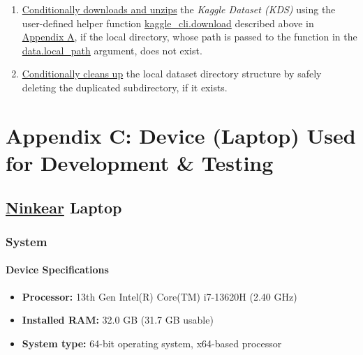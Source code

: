 \documentclass[
]{report}
\providecommand{\tightlist}{%
  \setlength{\itemsep}{0pt}\setlength{\parskip}{0pt}}
\begin{document}
\begin{enumerate}
\def\labelenumi{\arabic{enumi}.}
\tightlist
\item
  \href{https://github.com/AzKurban-edX-DS/edx.capstone.choose-your-own/blob/main/r/support-scripts/ds.kaggle.download.R\#L14-L26}{Conditionally downloads and unzips} the \emph{Kaggle Dataset (KDS)} using the user-defined helper function \hyperref[func.kaggle_cli.download]{kaggle\_cli.download} described above in \hyperref[appndx_a]{Appendix A}, if the local directory, whose path is passed to the function in the \hyperref[func.kaggle_cli.download.args.data.local_path]{data.local\_path} argument, does not exist.
\item
  \href{https://github.com/AzKurban-edX-DS/edx.capstone.choose-your-own/blob/main/r/support-scripts/ds.kaggle.download.R\#L29-L41}{Conditionally cleans up} the local dataset directory structure by safely deleting the duplicated subdirectory, if it exists.
\end{enumerate}

\chapter{Appendix C: Device (Laptop) Used for Development \& Testing}\label{appndx_c}

\section{\texorpdfstring{\href{https://ninkear.com/collections/laptops}{Ninkear} Laptop}{Ninkear Laptop}}\label{ninkear-laptop}

\hfill\break

\subsection{System}\label{system}

\subsubsection{Device Specifications}\label{device-specifications}

\begin{itemize}
\tightlist
\item
  \textbf{Processor:} 13th Gen Intel(R) Core(TM) i7-13620H (2.40 GHz)
\item
  \textbf{Installed RAM:} 32.0 GB (31.7 GB usable)
\item
  \textbf{System type:} 64-bit operating system, x64-based processor
\end{itemize}
\end{document}
